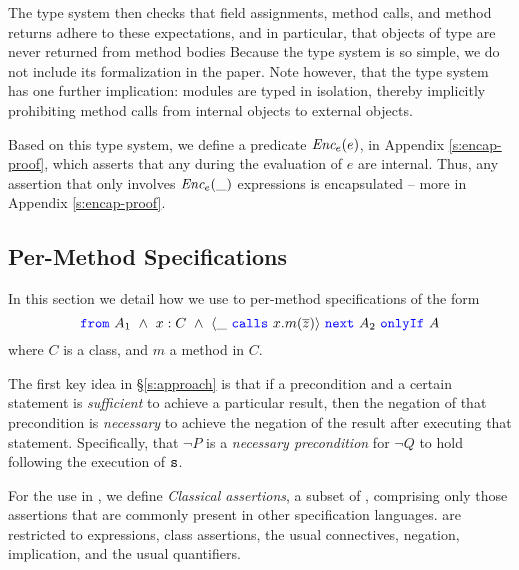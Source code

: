 The type system then checks 
that field assignments, method calls, and method returns adhere to these expectations,
and in particular, that objects of \enclosed type
are never returned from method bodies 
Because the type system is so simple, we do not include its formalization in the paper.
Note however, that the type system has one further implication: modules are typed 
in isolation, thereby implicitly prohibiting
method calls from internal objects to external objects. 

Based on this type system, we define a predicate $\textit{Enc$_e$}(e)$, in Appendix \ref{s:encap-proof},
which asserts that any  during the evaluation of $e$ are internal.
Thus, any assertion that only involves $\textit{Enc$_e$}(\_)$ expressions is encapsulated -- more in Appendix \ref{s:encap-proof}.

\subsection{Per-Method \Nec Specifications}
\label{s:classical-proof}
In this section we detail how we use \funcSpecs
to  per-method \Nec specifications  
of the form 
$$\onlyIfSingle{A_1\ \wedge\ x : C\ \wedge\ \calls{\_}{x}{m}{\overline{z}}}{A_2}{A}$$
where $C$ is a class, and $m$ a method in $C$.


The first key idea in \S \ref{s:approach}
is that if a precondition and a certain statement is \emph{sufficient}
to achieve a particular result, %
then the negation of that precondition
is \emph{necessary} to achieve the negation of the result after executing that statement.
Specifically, 
  that $\neg P$ is a \emph{necessary precondition} for $\neg Q$ to 
hold following the execution of ${\texttt{s}}$.

For the use in \funcSpecs, we define \emph{Classical assertions}, a subset of \SpecO, comprising only those 
assertions that are commonly present in other specification languages.
 are restricted to expressions, class assertions, the usual connectives, negation, 
implication, and the usual quantifiers.


